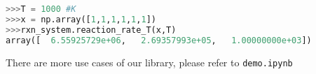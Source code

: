 \documentclass[12pt]{article}
\begin{document}
\begin{lstlisting}[language = Python, basicstyle = \ttfamily,columns = fullflexible, showstringspaces = False]
>>>T = 1000 #K
>>>x = np.array([1,1,1,1,1,1])
>>>rxn_system.reaction_rate_T(x,T)
array([  6.55925729e+06,   2.69357993e+05,   1.00000000e+03])
\end{lstlisting}

There are more use cases of our library, please refer to {\tt demo.ipynb}
\end{document}
